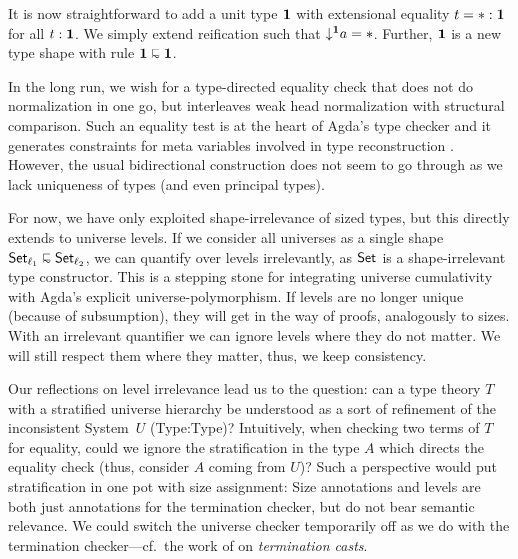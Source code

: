 \documentclass[acmsmall%
]{acmart}\settopmatter{printfolios=true}
\begin{document}
It is now straightforward to add a unit type $\mathbf{1}$ with extensional equality $t = {*} : \mathbf{1}$ for all $t : \mathbf{1}$.  We simply extend reification such that $\mathord{\downarrow^{\mathbf{1}}} a = {*}$.  Further, $\mathbf{1}$ is a new type shape with rule $\One \shape \One$.


In the long run, we wish for a type-directed equality check that does
not do normalization in one go, but interleaves weak head normalization
with structural comparison.
Such an equality test is at the heart of Agda's type
checker and it generates constraints for meta variables
involved in type reconstruction \cite{norell:PhD}.  However, the usual
bidirectional construction \cite{abelScherer:types10} does not seem to
go through as we lack uniqueness of types (and even principal types).

For now, we have only exploited shape-irrelevance of sized types, but this directly extends to universe levels.  If we consider all universes as a single shape $\Set[\ell_1] \shape \Set[\ell_2]$, we can quantify over levels irrelevantly, as $\mathsf{Set}_{}$ is a shape-irrelevant type constructor.  This is a stepping stone for integrating universe cumulativity with Agda's explicit universe-polymorphism.  If levels are no longer unique (because of subsumption), they will get in the way of proofs, analogously to sizes.  With an irrelevant quantifier we can ignore levels where they do not matter.  We will still respect them where they matter, thus, we keep consistency.

Our reflections on level irrelevance lead us to the question: can a type theory $T$ with a stratified universe hierarchy be understood as a sort of refinement of the inconsistent System~$U$ (Type:Type)?  Intuitively, when checking two terms of $T$ for equality, could we ignore the stratification in the type $A$ which directs the equality check (thus, consider $A$ coming from $U$)?
Such a perspective would put stratification in one pot with size assignment:  Size annotations and levels are both just annotations for the termination checker, but do not bear semantic relevance.  We could switch the universe checker temporarily off as we do with the termination checker---cf.\ the work of \citet{stumpSjobergWeirich:par10} on \emph{termination casts}.
\end{document}
